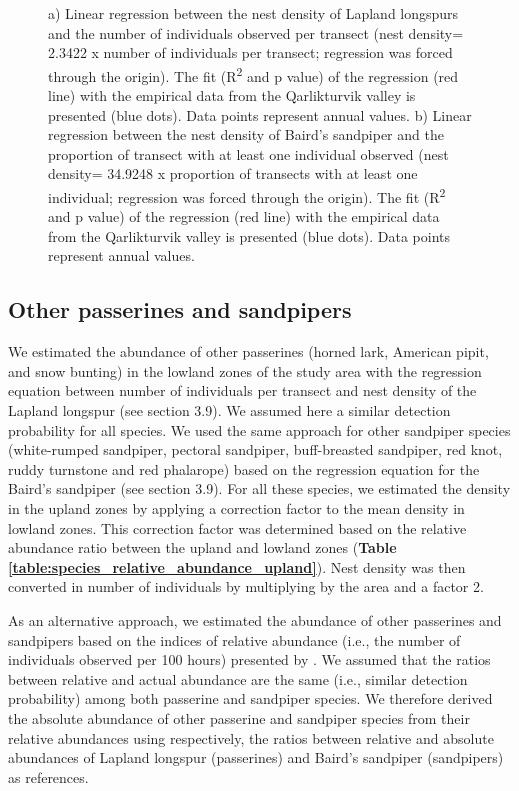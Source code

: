 \documentclass[a4paper,twoside,10pt]{article}
\begin{document}
\begin{figure}[H]
\begin{subfigure}{0.5\textwidth}
\caption{}
\end{subfigure}
\caption{a) Linear regression between the nest density of Lapland longspurs and the number of individuals observed per transect (nest density= 2.3422 x number of individuals per transect; regression was forced through the origin). The fit (R\textsuperscript{2} and p value) of the regression (red line) with the empirical data from the Qarlikturvik valley is presented (blue dots). Data points represent annual values. b) Linear regression between the nest density of Baird’s sandpiper and the proportion of transect with at least one individual observed (nest density= 34.9248 x proportion of transects with at least one individual; regression was forced through the origin). The fit (R\textsuperscript{2} and p value) of the regression (red line) with the empirical data from the Qarlikturvik valley is presented (blue dots). Data points represent annual values.}
\label{figure:lalo_basa}
\end{figure} 

\subsection{Other passerines and sandpipers}
We estimated the abundance of other passerines (horned lark, American pipit, and snow bunting) in the lowland zones of the study area with the regression equation between number of individuals per transect and nest density of the Lapland longspur (see section 3.9). We assumed here a similar detection probability for all species. We used the same approach for other sandpiper species (white-rumped sandpiper, pectoral sandpiper, buff-breasted sandpiper, red knot, ruddy turnstone and red phalarope) based on the regression equation for the Baird's sandpiper (see section 3.9). For all these species, we estimated the density in the upland zones by applying a correction factor to the mean density in lowland zones. This correction factor was determined based on the relative abundance ratio between the upland and lowland zones (\textbf{Table \ref{table:species_relative_abundance_upland}}). Nest density was then converted in number of individuals by multiplying by the area and a factor 2.

As an alternative approach, we estimated the abundance of other passerines and sandpipers based on the indices of relative abundance (i.e., the number of individuals observed per 100 hours) presented by \citet{gauthier2024a}. We assumed that the ratios between relative and actual abundance are the same (i.e., similar detection probability) among both passerine and sandpiper species. We therefore derived the absolute abundance of other passerine and sandpiper species from their relative abundances using respectively, the ratios between relative and absolute abundances of Lapland longspur (passerines) and Baird’s sandpiper (sandpipers) as references.
\end{document}
